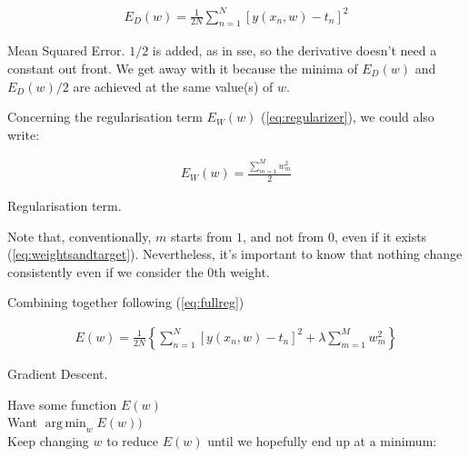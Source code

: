 \begin{Equation}[H]
	\centering
	\begin{equation} \label{eq:mser}
		\begin{aligned}
			E_D(w) = \frac{1}{2N} \sum_{n=1}^{N} [y(x_n,w)-t_n]^2
		\end{aligned}
	\end{equation}
	\caption[Mean Squared Error.]{Mean Squared Error. $1/2$ is added, as in \gls{sse}, so the derivative doesn't need a constant out front. We get away with it because the minima of $E_D(w)$ and $E_D(w) / 2$ are achieved at the same value(s) of $w$.}
\end{Equation}

\noindent Concerning the regularisation term $E_W(w)$ (\ref{eq:regularizer}), we could also write:
\begin{Equation}[H]
	\centering
	\begin{equation} \label{eq:regnew}
		\begin{aligned}
			E_W(w) = \frac{ \sum_{m=1}^{M} {w^2_m}}{2}
		\end{aligned}
	\end{equation}
	\caption[Regularisation term.]{Regularisation term.}
\end{Equation}

\noindent Note that, conventionally, $m$ starts from $1$, and not from $0$, even if it exists (\ref{eq:weightsandtarget}). Nevertheless, it's important to know that nothing change consistently even if we consider the 0th weight. 

\noindent Combining together following (\ref{eq:fullreg}) 

\begin{Equation}[H]
	\centering
	\begin{equation} \label{eq:fullregnew}
	\begin{aligned}
	E(w) = \frac{1}{2N} \left\{ \sum_{n=1}^{N} [ y(x_n,w)-t_n ]^2 + \lambda \sum_{m=1}^{M} {w^2_m} \right\}
	\end{aligned}
	\end{equation}
	\caption{Gradient Descent.}
\end{Equation}

\noindent Have some function $E(w)$ \\
\noindent Want $\operatorname*{arg\,min}_w  E(w))$ \\

\noindent Keep changing $w$ to reduce $E(w)$ until we hopefully end up at a minimum:

